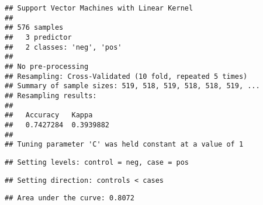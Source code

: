 \documentclass[]{article}
\newenvironment{Shaded}{\begin{snugshade}}{\end{snugshade}}
\newcommand{\DataTypeTok}[1]{\textcolor[rgb]{0.13,0.29,0.53}{#1}}
\newcommand{\DecValTok}[1]{\textcolor[rgb]{0.00,0.00,0.81}{#1}}
\newcommand{\KeywordTok}[1]{\textcolor[rgb]{0.13,0.29,0.53}{\textbf{#1}}}
\newcommand{\NormalTok}[1]{#1}
\newcommand{\OperatorTok}[1]{\textcolor[rgb]{0.81,0.36,0.00}{\textbf{#1}}}
\newcommand{\StringTok}[1]{\textcolor[rgb]{0.31,0.60,0.02}{#1}}
\begin{document}
\begin{verbatim}
## Support Vector Machines with Linear Kernel 
## 
## 576 samples
##   3 predictor
##   2 classes: 'neg', 'pos' 
## 
## No pre-processing
## Resampling: Cross-Validated (10 fold, repeated 5 times) 
## Summary of sample sizes: 519, 518, 519, 518, 518, 519, ... 
## Resampling results:
## 
##   Accuracy   Kappa    
##   0.7427284  0.3939882
## 
## Tuning parameter 'C' was held constant at a value of 1
\end{verbatim}

\begin{Shaded}
\end{Shaded}

\begin{verbatim}
## Setting levels: control = neg, case = pos
\end{verbatim}

\begin{verbatim}
## Setting direction: controls < cases
\end{verbatim}

\begin{verbatim}
## Area under the curve: 0.8072
\end{verbatim}

\begin{Shaded}
\end{Shaded}
\end{document}
